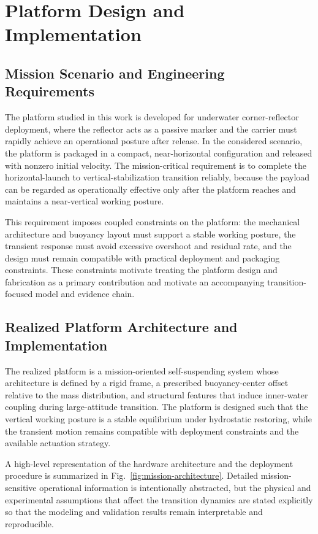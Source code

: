 \section{Platform Design and Implementation}

\subsection{Mission Scenario and Engineering Requirements}

The platform studied in this work is developed for underwater corner-reflector deployment, where the reflector acts as a passive marker and the carrier must rapidly achieve an operational posture after release. In the considered scenario, the platform is packaged in a compact, near-horizontal configuration and released with nonzero initial velocity. The mission-critical requirement is to complete the horizontal-launch to vertical-stabilization transition reliably, because the payload can be regarded as operationally effective only after the platform reaches and maintains a near-vertical working posture.

This requirement imposes coupled constraints on the platform: the mechanical architecture and buoyancy layout must support a stable working posture, the transient response must avoid excessive overshoot and residual rate, and the design must remain compatible with practical deployment and packaging constraints. These constraints motivate treating the platform design and fabrication as a primary contribution and motivate an accompanying transition-focused model and evidence chain.

\subsection{Realized Platform Architecture and Implementation}

The realized platform is a mission-oriented self-suspending system whose architecture is defined by a rigid frame, a prescribed buoyancy-center offset relative to the mass distribution, and structural features that induce inner-water coupling during large-attitude transition. The platform is designed such that the vertical working posture is a stable equilibrium under hydrostatic restoring, while the transient motion remains compatible with deployment constraints and the available actuation strategy.

A high-level representation of the hardware architecture and the deployment procedure is summarized in Fig.~\ref{fig:mission-architecture}. Detailed mission-sensitive operational information is intentionally abstracted, but the physical and experimental assumptions that affect the transition dynamics are stated explicitly so that the modeling and validation results remain interpretable and reproducible.

